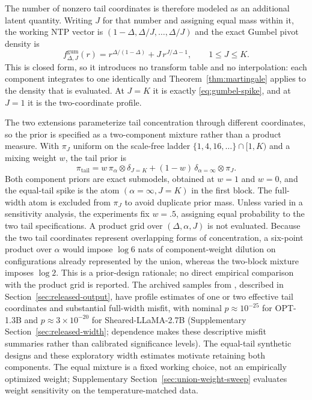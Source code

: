 \documentclass[11pt]{article}
\begin{document}
The number of nonzero tail coordinates is therefore modeled as an additional latent
quantity.  Writing $J$ for that number and assigning equal mass within it, the
working NTP vector is $(1-\Delta,\Delta/J,\ldots,\Delta/J)$ and the exact Gumbel
pivot density is
\begin{equation}
  f^{\mathrm{gum}}_{\Delta,J}(r)
  =r^{\Delta/(1-\Delta)}+J\,r^{J/\Delta-1},
  \qquad 1\le J\le K.
  \label{eq:gumbel-tailwidth}
\end{equation}
This is closed form, so it introduces no transform table and no interpolation:
each component integrates to one identically and Theorem~\ref{thm:martingale}
applies to the density that is evaluated.  At $J=K$ it is exactly
\eqref{eq:gumbel-spike}, and at $J=1$ it is the two-coordinate profile.

The two extensions parameterize tail concentration through different coordinates,
so the prior is specified as a two-component mixture rather than a product measure.  With
$\pi_J$ uniform on the scale-free ladder $\{1,4,16,\ldots\}\cap[1,K)$ and a
mixing weight $w$, the tail prior is
\begin{equation}
  \pi_{\mathrm{tail}}
  =w\,\pi_\alpha\otimes\delta_{J=K}
  +(1-w)\,\delta_{\alpha=\infty}\otimes\pi_J .
  \label{eq:union-tail}
\end{equation}
Both component priors are exact submodels, obtained at $w=1$ and $w=0$, and the
equal-tail spike is the atom $(\alpha=\infty,J=K)$ in the first block.  The
full-width atom is excluded from $\pi_J$ to avoid duplicate prior mass.  Unless varied in a sensitivity analysis, the
experiments fix $w=.5$, assigning equal probability to the two tail specifications.
A product grid over $(\Delta,\alpha,J)$ is not
evaluated.  Because the two tail coordinates represent overlapping forms of
concentration, a six-point product over $\alpha$ would impose $\log 6$ nats of
component-weight dilution on configurations already represented by the union,
whereas the two-block mixture imposes $\log 2$.  This is a prior-design rationale;
no direct empirical comparison with the product grid is reported.  The archived
samples from \citet{li2025framework}, described in Section~\ref{sec:released-output},
have profile estimates of one or two effective tail coordinates and
substantial full-width misfit, with nominal $p\approx10^{-25}$ for OPT-1.3B and
$p\approx3\times10^{-20}$ for Sheared-LLaMA-2.7B
(Supplementary Section~\ref{sec:released-width}; dependence makes these descriptive
misfit summaries rather than calibrated significance levels).  The equal-tail
synthetic designs and these exploratory width estimates motivate retaining both
components.  The equal mixture is a fixed working choice, not an empirically
optimized weight; Supplementary Section~\ref{sec:union-weight-sweep} evaluates
weight sensitivity on the temperature-matched data.
\end{document}
